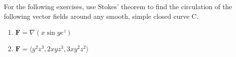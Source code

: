\documentclass{exercises}
\begin{document}
For the following exercises, use Stokes' theorem to find the circulation of the following vector fields around any smooth, simple closed curve C.

\begin{enumerate}[resume]
\item $\mathbf{F}=\nabla(x\sin ye^{z})$
\item $\mathbf{F}=\langle y^{2}z^{3},2xyz^{3},3xy^{2}z^{2}\rangle$
\end{enumerate}
\end{document}
